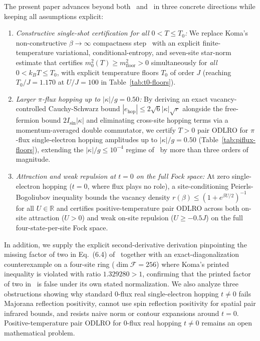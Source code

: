 \documentclass[11pt]{article}
\theoremstyle{definition}
\theoremstyle{remark}
\newcommand{\calF}{\mathcal{F}}
\begin{document}
The present paper advances beyond both~\cite{koma2022} and~\cite{rens2026eta} in three concrete directions while keeping all assumptions explicit:
\begin{enumerate}[label=(\alph*),leftmargin=2em]
\item \emph{Constructive single-shot certification for all $0 < T \le T_0$:} We replace Koma's non-constructive $\beta \to \infty$ compactness step~\cite{koma2022} with an explicit finite-temperature variational, conditional-entropy, and seven-site star-norm estimate that certifies $m_0^2(T) \ge m_{\mathrm{floor}}^2 > 0$ simultaneously for \emph{all} $0 < k_B T \le T_0$, with explicit temperature floors $T_0$ of order $J$ (reaching $T_0/J = 1.170$ at $U/J = 100$ in Table~\ref{tab:t0-floors}).
\item \emph{Larger $\pi$-flux hopping up to $|\kappa|/g = 0.50$:} By deriving an exact vacancy-controlled Cauchy-Schwarz bound $|e_{\mathrm{hop}}| \le 2\sqrt{6}|\kappa|\sqrt{r}$ alongside the free-fermion bound $2I_{\sin}|\kappa|$ and eliminating cross-site hopping terms via a momentum-averaged double commutator, we certify $T > 0$ pair ODLRO for $\pi$-flux single-electron hopping amplitudes up to $|\kappa|/g = 0.50$ (Table~\ref{tab:piflux-floors}), extending the $|\kappa|/g \le 10^{-4}$ regime of~\cite{rens2026eta} by more than three orders of magnitude.
\item \emph{Attraction and weak repulsion at $t = 0$ on the full Fock space:} At zero single-electron hopping ($t=0$, where flux plays no role), a site-conditioning Peierls-Bogoliubov inequality bounds the vacancy density $r(\beta) \le (1 + e^{\beta U/2})^{-1}$ for all $U \in \mathbb{R}$ and certifies positive-temperature pair ODLRO across both on-site attraction ($U > 0$) and weak on-site repulsion ($U \ge -0.5J$) on the full four-state-per-site Fock space.
\end{enumerate}
In addition, we supply the explicit second-derivative derivation pinpointing the missing factor of two in Eq.~(6.4) of~\cite{koma2022} together with an exact-diagonalization counterexample on a four-site ring ($\dim\calF = 256$) where Koma's printed inequality is violated with ratio $1.329280 > 1$, confirming that the printed factor of two in~\cite{koma2022} is false under its own stated normalization. We also analyze three obstructions showing why standard $0$-flux real single-electron hopping $t \ne 0$ fails Majorana reflection positivity, cannot use spin reflection positivity for spatial pair infrared bounds, and resists naive norm or contour expansions around $t=0$. Positive-temperature pair ODLRO for $0$-flux real hopping $t \ne 0$ remains an open mathematical problem.
\end{document}
